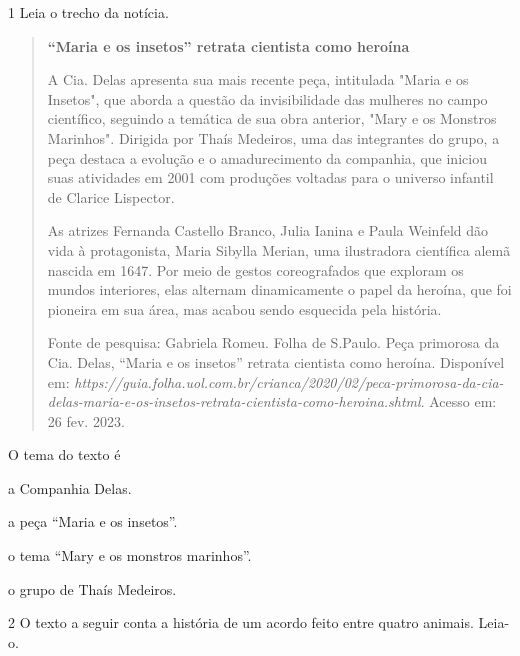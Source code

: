 
\num{1} Leia o trecho da notícia.

\begin{quote}

\textbf{``Maria e os insetos'' retrata cientista como heroína}

A Cia. Delas apresenta sua mais recente peça, intitulada "Maria e os Insetos", que aborda a questão da invisibilidade das mulheres no campo científico, seguindo a temática de sua obra anterior, "Mary e os Monstros Marinhos". Dirigida por Thaís Medeiros, uma das integrantes do grupo, a peça destaca a evolução e o amadurecimento da companhia, que iniciou suas atividades em 2001 com produções voltadas para o universo infantil de Clarice Lispector.

As atrizes Fernanda Castello Branco, Julia Ianina e Paula Weinfeld dão vida à protagonista, Maria Sibylla Merian, uma ilustradora científica alemã nascida em 1647. Por meio de gestos coreografados que exploram os mundos interiores, elas alternam dinamicamente o papel da heroína, que foi pioneira em sua área, mas acabou sendo esquecida pela história.

Fonte de pesquisa: Gabriela Romeu. Folha de S.Paulo. Peça primorosa da Cia. Delas, ``Maria e os insetos'' retrata cientista como heroína. Disponível em:
\emph{https://guia.folha.uol.com.br/crianca/2020/02/peca-primorosa-da-cia-delas-maria-e-os-insetos-retrata-cientista-como-heroina.shtml}.
Acesso em: 26 fev. 2023.
\end{quote}

O tema do texto é

\begin{escolha}
\item a Companhia Delas.

\item a peça ``Maria e os insetos''.

\item o tema ``Mary e os monstros marinhos''.

\item o grupo de Thaís Medeiros.
\end{escolha}

\pagebreak
\num{2} O texto a seguir conta a história de um acordo feito entre quatro
animais. Leia-o.

